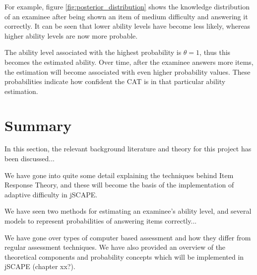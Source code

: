 For example, figure \ref{fig:posterior_distribution} shows the knowledge distribution of an examinee after being shown an item of medium difficulty and answering it correctly. It can be seen that lower ability levels have become less likely, whereas higher ability levels are now more probable.\newline

The ability level associated with the highest probability is $\theta=1$, thus this becomes the estimated ability. Over time, after the examinee answers more items, the estimation will become associated with even higher probability values. These probabilities indicate how confident the CAT is in that particular ability estimation.

\section{Summary}
In this section, the relevant background literature and theory for this project has been discussed...\newline

We have gone into quite some detail explaining the techniques behind Item Response Theory, and these will become the basis of the implementation of adaptive difficulty in jSCAPE.\newline

We have seen two methods for estimating an examinee's ability level, and several models to represent probabilities of answering items correctly...\newline

We have gone over types of computer based assessment and how they differ from regular assessment techniques. We have also provided an overview of the theoretical components and probability concepts which will be implemented in jSCAPE (chapter xx?).
